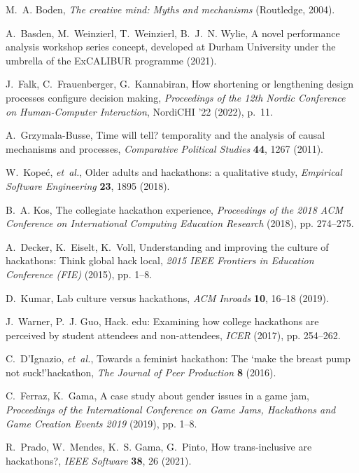 \documentclass{ieeeaccess}
\begin{document}
\begin{thebibliography}{10}
M.~A. Boden, {\it The creative mind: Myths and mechanisms\/} (Routledge, 2004).

A.~Basden, M.~Weinzierl, T.~Weinzierl, B.~J.~N. Wylie, {A novel performance
  analysis workshop series concept, developed at Durham University under the
  umbrella of the ExCALIBUR programme} (2021).

J.~Falk, C.~Frauenberger, G.~Kannabiran, How shortening or lengthening design
  processes configure decision making, {\it Proceedings of the 12th Nordic
  Conference on Human-Computer Interaction\/}, NordiCHI '22 (2022), p.~11.

A.~Grzymala-Busse, Time will tell? temporality and the analysis of causal
  mechanisms and processes, {\it Comparative Political Studies\/} {\bf 44},
  1267 (2011).

W.~Kope{\'c}, {\it et~al.\/}, Older adults and hackathons: a qualitative study,
  {\it Empirical Software Engineering\/} {\bf 23}, 1895 (2018).

B.~A. Kos, The collegiate hackathon experience, {\it Proceedings of the 2018
  ACM Conference on International Computing Education Research\/} (2018), pp.
  274--275.

A.~Decker, K.~Eiselt, K.~Voll, Understanding and improving the culture of
  hackathons: Think global hack local, {\it 2015 IEEE Frontiers in Education
  Conference (FIE)\/} (2015), pp. 1--8.

D.~Kumar, Lab culture versus hackathons, {\it ACM Inroads\/} {\bf 10}, 16–18
  (2019).

J.~Warner, P.~J. Guo, Hack. edu: Examining how college hackathons are perceived
  by student attendees and non-attendees, {\it ICER\/} (2017), pp. 254--262.

C.~D’Ignazio, {\it et~al.\/}, Towards a feminist hackathon: The ‘make the
  breast pump not suck!’hackathon, {\it The Journal of Peer Production\/}
  {\bf 8} (2016).

C.~Ferraz, K.~Gama, A case study about gender issues in a game jam, {\it
  Proceedings of the International Conference on Game Jams, Hackathons and Game
  Creation Events 2019\/} (2019), pp. 1--8.

R.~Prado, W.~Mendes, K.~S. Gama, G.~Pinto, How trans-inclusive are hackathons?,
  {\it IEEE Software\/} {\bf 38}, 26 (2021).


\end{thebibliography}
\end{document}
